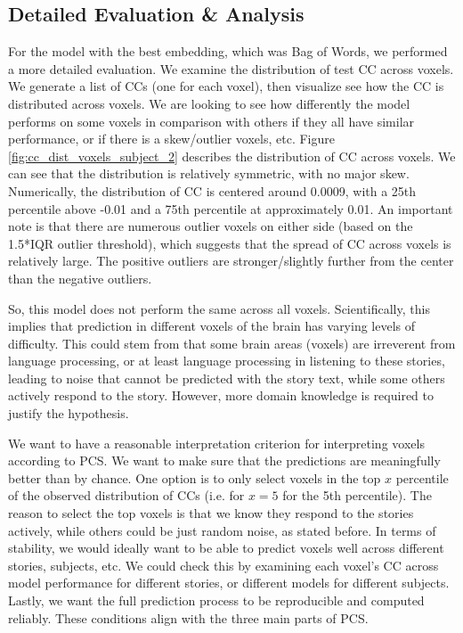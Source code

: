\documentclass[10pt,letterpaper]{article}
\begin{document}
\subsection{Detailed Evaluation \& Analysis}
For the model with the best embedding, which was Bag of Words, we performed a more detailed evaluation. We examine the distribution of test CC across voxels. We generate a list of CCs (one for each voxel), then visualize see how the CC is distributed across voxels. We are looking to see how differently the model performs on some voxels in comparison with others if they all have similar performance, or if there is a skew/outlier voxels, etc. Figure \ref{fig:cc_dist_voxels_subject_2} describes the distribution of CC across voxels. We can see that the distribution is relatively symmetric, with no major skew. Numerically, the distribution of CC is centered around 0.0009, with a 25th percentile above -0.01 and a 75th percentile at approximately 0.01. An important note is that there are numerous outlier voxels on either side (based on the 1.5*IQR outlier threshold), which suggests that the spread of CC across voxels is relatively large. The positive outliers are stronger/slightly further from the center than the negative outliers.

So, this model does not perform the same across all voxels. Scientifically, this implies that prediction in different voxels of the brain has varying levels of difficulty. This could stem from that some brain areas (voxels) are irreverent from language processing, or at least language processing in listening to these stories, leading to noise that cannot be predicted with the story text, while some others actively respond to the story. However, more domain knowledge is required to justify the hypothesis.

We want to have a reasonable interpretation criterion for interpreting voxels according to PCS. We want to make sure that the predictions are meaningfully better than by chance. One option is to only select voxels in the top \(x\) percentile of the observed distribution of CCs (i.e. for \(x=5\) for the 5th percentile). The reason to select the top voxels is that we know they respond to the stories actively, while others could be just random noise, as stated before. In terms of stability, we would ideally want to be able to predict voxels well across different stories, subjects, etc. We could check this by examining each voxel's CC across model performance for different stories, or different models for different subjects. Lastly, we want the full prediction process to be reproducible and computed reliably. These conditions align with the three main parts of PCS.
\end{document}

